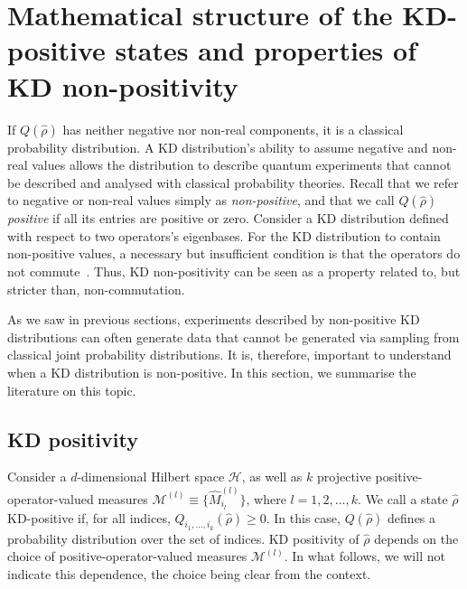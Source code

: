 \documentclass[%
 reprint,
superscriptaddress,
nofootinbib,
bibnotes,
 amsmath,amssymb,
 aps,
]{revtex4-1}
\theoremstyle{plain}
\newcommand{\Hcal}{{\mathcal H}}
\begin{document}
\section{Mathematical structure of the KD-positive states and properties of KD non-positivity}
\label{Sec:NonPos}

If  $Q \left( \hat{\rho} \right)$  has neither negative nor non-real components,  it is  a classical probability distribution.  A KD distribution's ability to assume negative and non-real values  allows the distribution to describe quantum experiments that cannot be described and analysed with classical probability theories. Recall that we refer to negative or non-real values simply as  \emph{non-positive}, and that we call $Q \left( \hat{\rho} \right) $ \emph{positive} if all its entries are positive or zero. Consider a KD distribution  defined with respect to two operators's eigenbases. For the KD distribution to contain non-positive values, a necessary but insufficient condition is that the operators do not commute~\cite{ArvidssonShukur2021}. 
Thus, KD non-positivity can be seen as a property related to, but stricter than, non-commutation.

As we saw in previous sections, experiments described by non-positive KD distributions can often generate data that cannot 
be generated via sampling from classical joint probability distributions. It is, therefore,  important to understand when a KD distribution is non-positive. In this section, we summarise the literature on this topic.




\subsection{KD positivity}


Consider a $d$-dimensional Hilbert space $\Hcal$, as well as $k$ projective positive-operator-valued measures $\mathcal{M}^{(l)} \equiv \{ \hat{M}_{i_l}^{(l)} \}$, where $l = 1,2,\ldots,k $. We call a  state $\hat{\rho}$ KD-positive if, for all  indices, $Q_{i_1,\ldots, i_k}(\hat{\rho}) \geq 0$.  In this case, $Q(\hat\rho)$ defines a probability distribution over the set of  indices.   KD positivity of $\hat\rho$ depends on the choice of  positive-operator-valued measures $\mathcal{M}^{(l)} $. In what follows, we will not indicate this dependence, the choice being clear from the context.  
\end{document}
